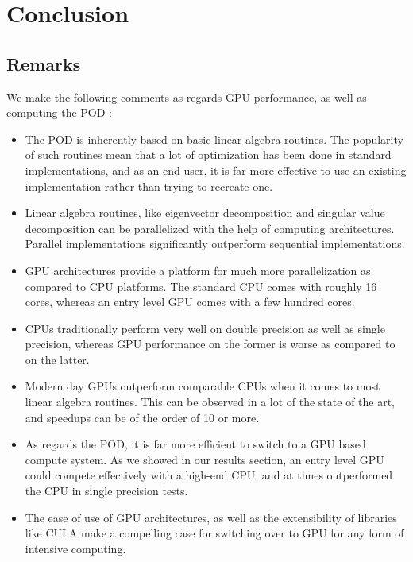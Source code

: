 \documentclass[submit]{aiaa-tc_mod}%
\begin{document}
\clearpage
\section{Conclusion}

\subsection{Remarks}
We make the following comments as regards GPU performance, as well as computing the POD :

\begin{itemize}

\item
The POD is inherently based on basic linear algebra routines. The popularity of such routines mean that a lot of optimization has been done in standard implementations, and as an end user, it is far more effective to use an existing implementation rather than trying to recreate one. 

\item
Linear algebra routines, like eigenvector decomposition and singular value decomposition can be parallelized with the help of computing architectures. Parallel implementations significantly outperform sequential implementations.

\item
GPU architectures provide a platform for much more parallelization as compared to CPU platforms. The standard CPU comes with roughly 16 cores, whereas an entry level GPU comes with a few hundred cores. 

\item
CPUs traditionally perform very well on double precision as well as single precision, whereas GPU performance on the former is worse as compared to on the latter. 

\item
Modern day GPUs outperform comparable CPUs when it comes to most linear algebra routines. This can be observed in a lot of the state of the art, and speedups can be of the order of 10 or more.

\item 
As regards the POD, it is far more efficient to switch to a GPU based compute system. As we showed in our results section, an entry level GPU could compete effectively with a high-end CPU, and at times outperformed the CPU in single precision tests. 

\item
The ease of use of GPU architectures, as well as the extensibility of libraries like CULA make a compelling case for switching over to GPU for any form of intensive computing. 
\end{itemize}
\end{document}

